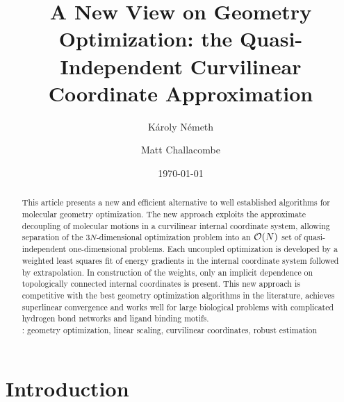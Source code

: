 \documentclass[prl,aps,preprint,showpacs,superbib]{revtex4}
\begin{document}
\title{A New View on Geometry Optimization: the Quasi-\\
       Independent Curvilinear Coordinate Approximation\footnotemark[1]}

\author{K\'aroly N\'emeth\footnotemark[2]}
\author{Matt Challacombe}


\date{\today}

\begin{abstract}
This article presents a new and efficient alternative to well established
algorithms for molecular geometry optimization.   The new approach 
exploits the approximate decoupling of molecular motions in a curvilinear 
internal coordinate system,  allowing separation  of the 3$N$-dimensional
optimization problem into an ${\cal{O}}(N)$ set of quasi-independent  
one-dimensional problems.  Each  uncoupled optimization is developed by 
a weighted least squares fit of energy gradients in the internal coordinate 
system followed by extrapolation.  In construction of the weights, only an 
implicit dependence on topologically connected internal coordinates is 
present.   This new approach is competitive with the best geometry optimization 
algorithms in the literature, achieves superlinear convergence and works well 
for large biological problems with complicated hydrogen bond networks and ligand 
binding motifs.\\[.1cm]
: geometry optimization, linear scaling, curvilinear coordinates, robust estimation
\end{abstract}


\maketitle


\section{Introduction}
\end{document}
